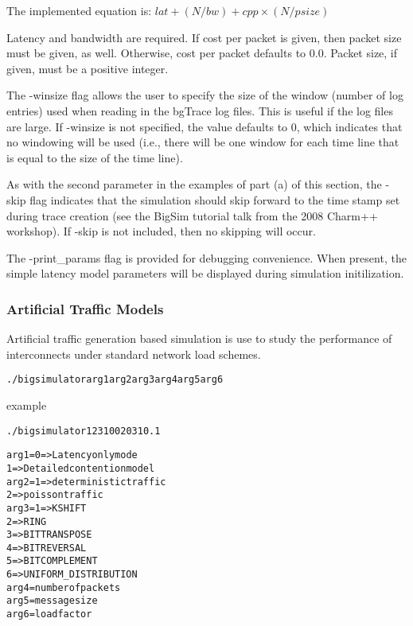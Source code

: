 The implemented equation is: $lat + (N/bw) + cpp \times (N/psize)$

Latency and bandwidth are required.  If cost per packet is given, then packet
size must be given, as well.  Otherwise, cost per packet defaults to 0.0.
Packet size, if given, must be a positive integer.

The -winsize flag allows the user to specify the size of the window (number of
log entries) used when reading in the bgTrace log files.  This is useful if the
log files are large.  If -winsize is not specified, the value defaults to 0,
which indicates that no windowing will be used (i.e., there will be one window
for each time line that is equal to the size of the time line).

As with the second parameter in the examples of part (a) of this section, the
-skip flag indicates that the simulation should skip forward to the time stamp
set during trace creation (see the BigSim tutorial talk from the 2008 Charm++
workshop).  If -skip is not included, then no skipping will occur.

The -print\_params flag is provided for debugging convenience.  When present,
the simple latency model parameters will be displayed during simulation
initilization.

\subsubsection{Artificial Traffic Models}
Artificial traffic generation based simulation is use to study the performance
of interconnects under standard network load schemes.

\begin{alltt}
  ./bigsimulator arg1 arg2 arg3 arg4 arg5 arg6
\end{alltt}
example
\begin{alltt}
  ./bigsimulator 1 2 3 100 2031 0.1
\end{alltt}

\begin{alltt}
  arg1 = 0 => Latency only mode
         1 => Detailed contention model
  arg2 = 1 => deterministic traffic
         2 => poisson traffic
  arg3 = 1 => KSHIFT
         2 => RING
         3 => BITTRANSPOSE
         4 => BITREVERSAL
         5 => BITCOMPLEMENT
         6 => UNIFORM\_DISTRIBUTION
  arg4 = number of packets
  arg5 = message size
  arg6 = load factor
\end{alltt}

